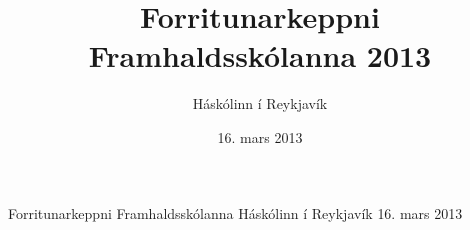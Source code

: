 \documentclass[11pt,a4paper,oneside]{article}
\title{Forritunarkeppni Framhaldsskólanna 2013}
\date{16. mars 2013}
\author{Háskólinn í Reykjavík}
\newcommand{\problemstatement}[1]{  }
\begin{document}

	\maketitle
	\thispagestyle{empty}
	\pagebreak

	\contest
	{Forritunarkeppni Framhaldsskólanna}%
	{Háskólinn í Reykjavík}%
	{16. mars 2013}%

	\problemstatement{TengdurListi}
	\problemstatement{OendanlegRuna}
	\problemstatement{FermatsLastTheorem}
	\problemstatement{SierpinskiTriangle}
	\problemstatement{KonunglegurMatur}
	\problemstatement{Frumtolur}
	\problemstatement{FatahengiSveinsLitla}
	\problemstatement{SkemmtilegarSetningar}
	\problemstatement{TicTacToe}
	\problemstatement{Bitmask}
	
	\problemstatement{Sort}
	\problemstatement{Thyngdarflokkur}
	\problemstatement{Breytunafn}
	\problemstatement{BefungeLoop}
	\problemstatement{Margfoldun}
	\problemstatement{Sqrt}
	\problemstatement{FostudagurinnThrettandi}
	\problemstatement{SamliggjandiTolur}
	\problemstatement{Maurar}
	\problemstatement{Pyramidi}
\end{document}
